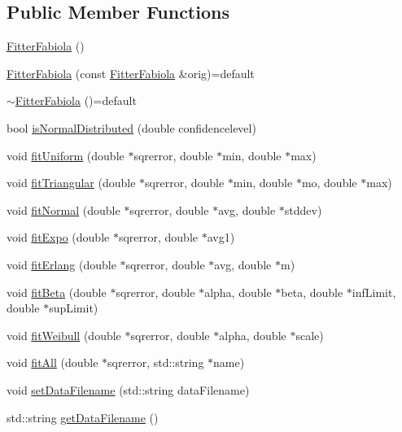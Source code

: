 \subsection*{Public Member Functions}
\begin{DoxyCompactItemize}
\item 
\hyperlink{class_fitter_fabiola_aa76bb097fe3a4ab680df26101c35e828}{Fitter\-Fabiola} ()
\item 
\hyperlink{class_fitter_fabiola_a1c1de0d77255dbbc873c995466ea230e}{Fitter\-Fabiola} (const \hyperlink{class_fitter_fabiola}{Fitter\-Fabiola} \&orig)=default
\item 
\hyperlink{class_fitter_fabiola_a131b72e0049fa12e41bd4c9f3a76e5b6}{$\sim$\-Fitter\-Fabiola} ()=default
\item 
bool \hyperlink{class_fitter_fabiola_a419faa9832e64f6508829271f0b13286}{is\-Normal\-Distributed} (double confidencelevel)
\item 
void \hyperlink{class_fitter_fabiola_aa4301083831a54b660a172e0ee5c9c76}{fit\-Uniform} (double $\ast$sqrerror, double $\ast$min, double $\ast$max)
\item 
void \hyperlink{class_fitter_fabiola_aaf668bdbe610ac1f9f83ef89796f7bd1}{fit\-Triangular} (double $\ast$sqrerror, double $\ast$min, double $\ast$mo, double $\ast$max)
\item 
void \hyperlink{class_fitter_fabiola_aa1e8d772536e5e3440a0c7207393c82c}{fit\-Normal} (double $\ast$sqrerror, double $\ast$avg, double $\ast$stddev)
\item 
void \hyperlink{class_fitter_fabiola_a45c241af82350d6faca63886013e704b}{fit\-Expo} (double $\ast$sqrerror, double $\ast$avg1)
\item 
void \hyperlink{class_fitter_fabiola_aa96f144a121ab8f4d8692e40ddf6bda0}{fit\-Erlang} (double $\ast$sqrerror, double $\ast$avg, double $\ast$m)
\item 
void \hyperlink{class_fitter_fabiola_a6de9b0d16c19105a540608cb27faf44b}{fit\-Beta} (double $\ast$sqrerror, double $\ast$alpha, double $\ast$beta, double $\ast$inf\-Limit, double $\ast$sup\-Limit)
\item 
void \hyperlink{class_fitter_fabiola_a7c80eaca6773e0b8d5ca6689b14188ec}{fit\-Weibull} (double $\ast$sqrerror, double $\ast$alpha, double $\ast$scale)
\item 
void \hyperlink{class_fitter_fabiola_ac15542ce538d83e78577e81d1667ff96}{fit\-All} (double $\ast$sqrerror, std\-::string $\ast$name)
\item 
void \hyperlink{class_fitter_fabiola_a3edd954df450b042f1989705c5e288ab}{set\-Data\-Filename} (std\-::string data\-Filename)
\item 
std\-::string \hyperlink{class_fitter_fabiola_aaa35374da24fb62cc9649311478d08f5}{get\-Data\-Filename} ()
\end{DoxyCompactItemize}


